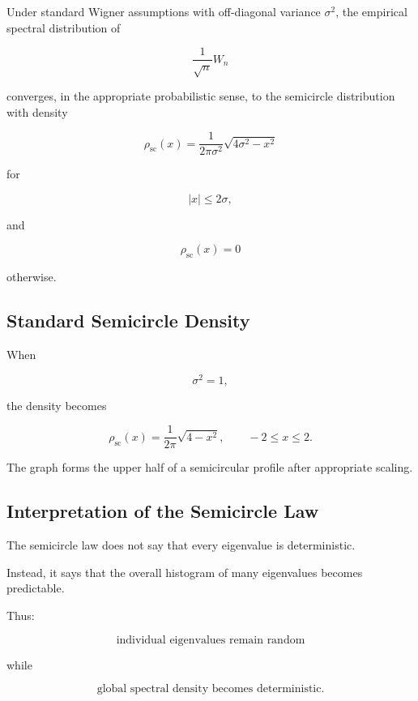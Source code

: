 \begin{theorem}
Under standard Wigner assumptions with off-diagonal variance
\(\sigma^2\), the empirical spectral distribution of

\[
\frac1{\sqrt{n}}W_n
\]

converges, in the appropriate probabilistic sense, to the semicircle
distribution with density

\[
\boxed{
\rho_{\mathrm{sc}}(x)
=
\frac{
1
}{
2\pi\sigma^2
}
\sqrt{
4\sigma^2-x^2
}
}
\]

for

\[
|x|\leq2\sigma,
\]

and

\[
\rho_{\mathrm{sc}}(x)=0
\]

otherwise.
\end{theorem}

\subsection{Standard Semicircle Density}
\label{subsec:standard-semicircle-density}

When

\[
\sigma^2=1,
\]

the density becomes

\[
\boxed{
\rho_{\mathrm{sc}}(x)
=
\frac1{2\pi}
\sqrt{
4-x^2
},
\qquad
-2\leq x\leq2.
}
\]

The graph forms the upper half of a semicircular profile after
appropriate scaling.

\subsection{Interpretation of the Semicircle Law}
\label{subsec:interpret-semicircle-law}

The semicircle law does not say that every eigenvalue is deterministic.

Instead, it says that the overall histogram of many eigenvalues becomes
predictable.

Thus:

\[
\boxed{
\text{individual eigenvalues remain random}
}
\]

while

\[
\boxed{
\text{global spectral density becomes deterministic}.
}
\]

